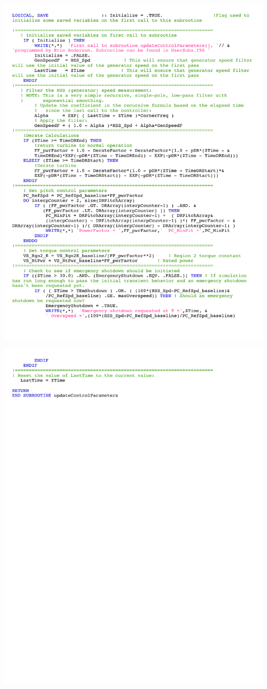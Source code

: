\noindent
\includegraphics[width=\linewidth]{Figures/AppendixDFigures/figD-3B.pdf}

\noindent
\includegraphics[width=\linewidth]{Figures/AppendixDFigures/figD-3C.pdf}

